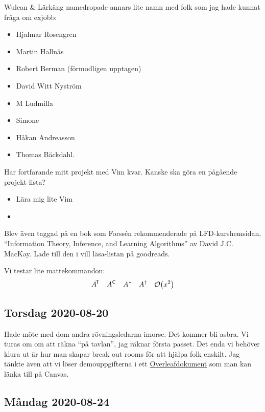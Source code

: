 Wulcan \& Lärkäng namedropade annars lite namn med folk som jag hade kunnat fråga om exjobb:
\begin{itemize}
    \item Hjalmar Rosengren
    \item Martin Hallnäs
    \item Robert Berman (förmodligen upptagen)
    \item David Witt Nyström
    \item M Ludmilla
    \item Simone
    \item Håkan Andreasson
    \item Thomas Bäckdahl.
\end{itemize}

\bigskip

Har fortfarande mitt projekt med Vim kvar. Kanske ska göra en pågående projekt-lista?
\begin{itemize}
    \item Lära mig lite Vim
    \item 
\end{itemize}

\bigskip

Blev även taggad på en bok som Forssén rekommenderade på LFD-kurshemsidan, \enquote{Information Theory, Inference, and Learning Algorithms} av David J.C. MacKay. Lade till den i vill läsa-listan på goodreads.

\bigskip

Vi testar lite mattekommandon:
\begin{align}
    \transpose{A}
    \quad
    \complement{A}
    \quad
    \conjugate{A}
    \quad
    \hermitianconjugate{A}
    \quad
    \order{x^2}
\end{align}


\subsection*{Torsdag 2020-08-20}

Hade möte med dom andra rövningsledarna imorse. Det kommer bli asbra. Vi turas om om att räkna \enquote{på tavlan}, jag räknar första passet. Det enda vi behöver klura ut är hur man skapar break out rooms för att hjälpa folk enskilt. Jag tänkte även att vi löser demouppgifterna i ett \href{https://www.overleaf.com/read/bkttgyjvnqbx}{\color{blue}Overleafdokument} som man kan länka till på Canvas.


\subsection*{Måndag 2020-08-24}

